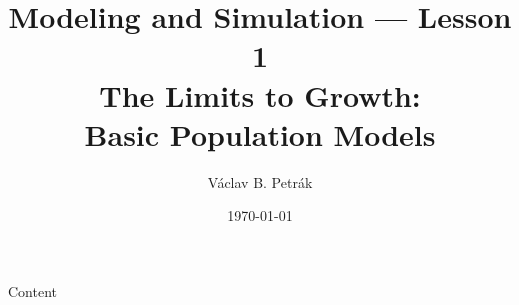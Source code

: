 \documentclass[11pt]{beamer}
\title{Modeling and Simulation --- Lesson 1\\
\textbf{The Limits to Growth:\\
Basic Population Models}}
\author{Václav B. Petrák}
\institute{Faculty of Biomedical Engineering\\
Czech Technical University in Prague}
\date{\today}
\begin{document}
\begin{frame}
  \titlepage
\end{frame}

\begin{frame}{Content}
    \tableofcontents 
\end{frame}
 
 
 


\end{document}
